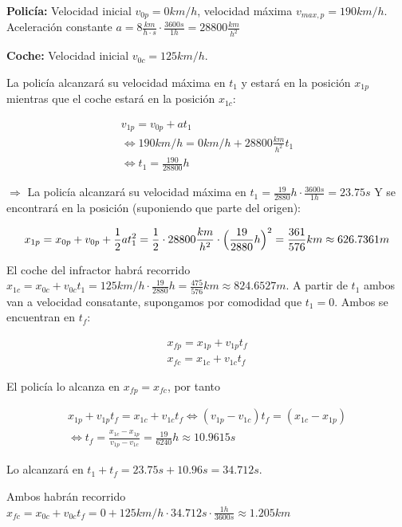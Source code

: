 \begin{solucion}

\textbf{Policía:} Velocidad inicial $v_{0p} = 0 km/h$, velocidad máxima $v_{max, p} = 190 km/h$. Aceleración constante $a = 8 \frac{km}{h \cdot s} \cdot \frac{3600s}{1h} = 28800 \frac{km}{h^2}$

\textbf{Coche:} Velocidad inicial $v_{0c} = 125km/h$.

La policía alcanzará su velocidad máxima en $t_1$ y estará en la posición $x_{1p}$ mientras que el coche estará en la posición $x_{1c}$:

\begin{gather*}
v_{1p} = v_{0p} + at_1 \\
\Leftrightarrow 190 km/h = 0 km/h + 28800 \frac{km}{h^2} t_1 \\
\Leftrightarrow t_1 = \frac{190}{28800} h
\end{gather*}

$\Rightarrow$ La policía alcanzará su velocidad máxima en $t_1 = \frac{19}{2880} h \cdot \frac{3600s}{1h} = 23.75 s$ Y se encontrará en la posición (suponiendo que parte del origen):

\begin{equation*}
    x_{1p} = x_{0p} + v_{0p} + \frac{1}{2}at_1^2 = \frac{1}{2}\cdot 28800 \frac{km}{h^2} \cdot \Bigl( \frac{19}{2880} h \Bigr)^2 = \frac{361}{576}km \approx 626.7361 m
\end{equation*}

El coche del infractor habrá recorrido $x_{1c} = x_{0c} + v_{0c}t_1 = 125 km/h \cdot \frac{19}{2880}h = \frac{475}{576}km \approx 824.6527 m$.
A partir de $t_1$ ambos van a velocidad consatante, supongamos por comodidad que $t_1 = 0$. Ambos se encuentran en $t_f$:

\begin{gather*}
    x_{fp} = x_{1p} + v_{1p}t_f \\
    x_{fc} = x_{1c} + v_{1c}t_f
\end{gather*}

El policía lo alcanza en $x_{fp} = x_{fc}$, por tanto

\begin{gather*}
    x_{1p} + v_{1p}t_f = x_{1c} + v_{1c}t_f \Leftrightarrow (v_{1p} - v_{1c})t_f = (x_{1c}-x_{1p}) \\
    \Leftrightarrow t_f = \frac{x_{1c}-x_{1p}}{v_{1p} - v_{1c}} = \frac{19}{6240}h \approx 10.9615s
\end{gather*}

Lo alcanzará en $t_1 + t_f = 23.75s + 10.96s = 34.712s$.

Ambos habrán recorrido $x_{fc} = x_{0c} + v_{0c}t_f = 0 + 125km/h \cdot 34.712s \cdot \frac{1h}{3600s} \approx 1.205 km$
\end{solucion}

